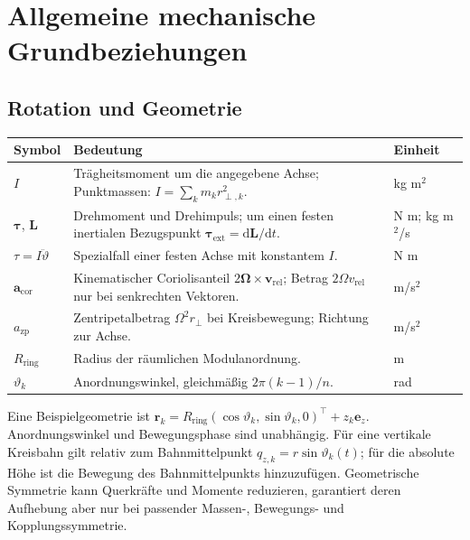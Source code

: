 \documentclass[11pt,a4paper]{article}
\makeatletter
\newcommand{\dd}{\mathrm{d}}
\newenvironment{symtab}{\begin{longtable}{@{}L{.22\textwidth}L{.62\textwidth}L{.12\textwidth}@{}}\toprule\textbf{Symbol}&\textbf{Bedeutung}&\textbf{Einheit}\\\midrule\endhead}{\bottomrule\end{longtable}}
\makeatother
\begin{document}
\section{Allgemeine mechanische Grundbeziehungen}
\subsection{Rotation und Geometrie}
\begin{symtab}
$I$&Trägheitsmoment um die angegebene Achse; Punktmassen: $I=\sum_k m_kr_{\perp,k}^2$.&kg m$^2$\\
$\boldsymbol\tau$, $\mathbf L$&Drehmoment und Drehimpuls; um einen festen inertialen Bezugspunkt $\boldsymbol\tau_{\mathrm{ext}}=\dd\mathbf L/\dd t$.&N m; kg m$^2$/s\\
$\tau=I\ddot\vartheta$&Spezialfall einer festen Achse mit konstantem $I$.&N m\\
$\mathbf a_{\mathrm{cor}}$&Kinematischer Coriolisanteil $2\boldsymbol\Omega\times\mathbf v_{\mathrm{rel}}$; Betrag $2\Omega v_{\mathrm{rel}}$ nur bei senkrechten Vektoren.&m/s$^2$\\
$a_{\mathrm{zp}}$&Zentripetalbetrag $\Omega^2r_\perp$ bei Kreisbewegung; Richtung zur Achse.&m/s$^2$\\
$R_{\mathrm{ring}}$&Radius der räumlichen Modulanordnung.&m\\
$\vartheta_k$&Anordnungswinkel, gleichmäßig $2\pi(k-1)/n$.&rad\\
\end{symtab}
Eine Beispielgeometrie ist $\mathbf r_k=R_{\mathrm{ring}}(\cos\vartheta_k,\sin\vartheta_k,0)^\top+z_k\mathbf e_z$. Anordnungswinkel und Bewegungsphase sind unabhängig. Für eine vertikale Kreisbahn gilt relativ zum Bahnmittelpunkt $q_{z,k}=r\sin\vartheta_k(t)$; für die absolute Höhe ist die Bewegung des Bahnmittelpunkts hinzuzufügen.
Geometrische Symmetrie kann Querkräfte und Momente reduzieren, garantiert deren Aufhebung aber nur bei passender Massen-, Bewegungs- und Kopplungssymmetrie.
\end{document}
